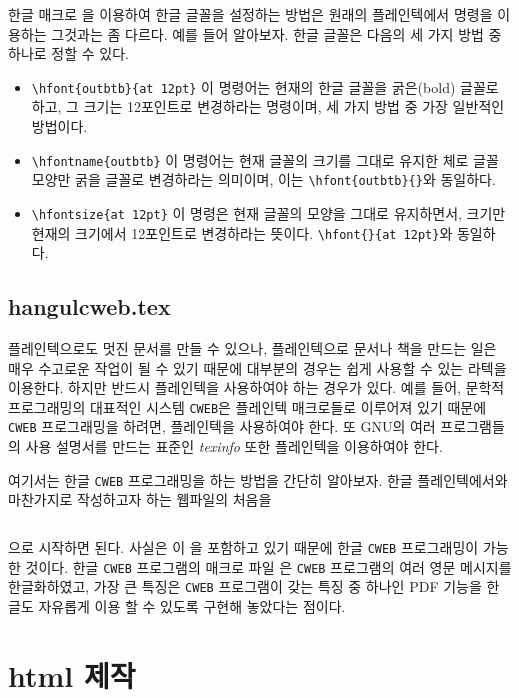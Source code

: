 한글 매크로 \kotexplain 을 이용하여 한글 글꼴을 설정하는 방법은 원래의
플레인텍에서 {\tt \string\font} 명령을 이용하는 그것과는 좀
다르다. 예를 들어 알아보자. 한글 글꼴은 다음의 세 가지 방법 중 하나로
정할 수 있다. 
\begin{itemize}
\item \verb|\hfont{outbtb}{at 12pt}| 이 명령어는 현재의 한글 글꼴을 굵은(bold) 글꼴로 하고,  그 크기는
12포인트로 변경하라는 명령이며, 세 가지 방법 중 가장 일반적인 방법이다.
\item \verb|\hfontname{outbtb}| 이
명령어는 현재 글꼴의 크기를 그대로 유지한 체로 글꼴 모양만 굵을 글꼴로
변경하라는 의미이며, 이는 \verb|\hfont{outbtb}{}|와 동일하다.
\item \verb|\hfontsize{at 12pt}| 이 명령은
현재 글꼴의 모양을 그대로 유지하면서, 크기만 현재의 크기에서 12포인트로
변경하라는 뜻이다. \verb|\hfont{}{at 12pt}|와 동일하다. 
\end{itemize}

\section{hangulcweb.tex}

플레인텍으로도 멋진 문서를 만들 수 있으나,
플레인텍으로 문서나 책을 만드는 일은 매우 수고로운 작업이 
될 수 있기 때문에
대부분의 경우는 쉽게 사용할 수 있는 라텍을 이용한다. 하지만
반드시 플레인텍을 사용하여야 하는 경우가 있다. 예를 들어, 문학적
프로그래밍의 대표적인 시스템 {\tt CWEB}은
플레인텍 매크로들로 이루어져 있기 때문에 {\tt CWEB} 프로그래밍을
하려면, 플레인텍을 사용하여야 한다. 또 GNU의 여러 프로그램들의 사용
설명서를 만드는 표준인 {\sl texinfo\/} 또한 플레인텍을 이용하여야 한다. 

여기서는 한글 {\tt CWEB} 프로그래밍을 하는 방법을 간단히
알아보자. 한글 플레인텍에서와 마찬가지로 작성하고자 하는 웹파일의 처음을
\begin{verbatim}

\end{verbatim}
으로 시작하면 된다. 사실은
\hangulcweb 이 \kotexplain 을 포함하고 있기 때문에 한글 {\tt CWEB}
프로그래밍이 가능한 것이다. 한글 {\tt CWEB}
프로그램의 매크로 파일 \hangulcweb 은 {\tt CWEB} 프로그램의 여러 영문
메시지를 한글화하였고, 가장 큰 특징은 {\tt CWEB} 프로그램이 갖는
특징 중 하나인 PDF 기능을 한글도 자유롭게 이용 할 수 있도록 구현해
놓았다는 점이다.

\chapter{html 제작}

